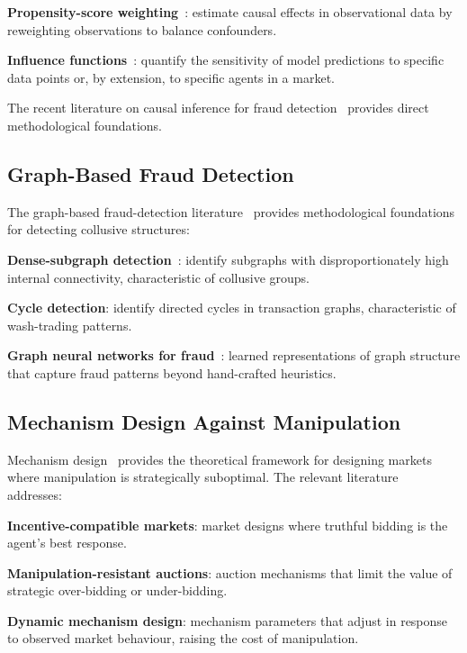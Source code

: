 \documentclass[sigconf,nonacm]{acmart}
\begin{document}
\textbf{Propensity-score weighting}~\cite{rosenbaum1983propensity}:
estimate causal effects in observational data by reweighting
observations to balance confounders.

\textbf{Influence functions}~\cite{koh2017influence}: quantify the
sensitivity of model predictions to specific data points or, by
extension, to specific agents in a market.

The recent literature on causal inference for fraud
detection~\cite{wang2024causalfraud,zhang2024causalmarket} provides
direct methodological foundations.

\subsection{Graph-Based Fraud Detection}

The graph-based fraud-detection literature~\cite{liu2024fraudgnn,
xu2024graphfraudsurv} provides methodological foundations for
detecting collusive structures:

\textbf{Dense-subgraph detection}~\cite{semertzidis2024densesubgraph}:
identify subgraphs with disproportionately high internal connectivity,
characteristic of collusive groups.

\textbf{Cycle detection}: identify directed cycles in transaction
graphs, characteristic of wash-trading patterns.

\textbf{Graph neural networks for fraud}~\cite{liu2024fraudgnn}:
learned representations of graph structure that capture fraud
patterns beyond hand-crafted heuristics.

\subsection{Mechanism Design Against Manipulation}

Mechanism design~\cite{nisan2007algorithmic} provides the
theoretical framework for designing markets where manipulation is
strategically suboptimal. The relevant
literature~\cite{liu2024strategicrank,jain2024mechmarket} addresses:

\textbf{Incentive-compatible markets}: market designs where
truthful bidding is the agent's best response.

\textbf{Manipulation-resistant auctions}: auction mechanisms that
limit the value of strategic over-bidding or under-bidding.

\textbf{Dynamic mechanism design}: mechanism parameters that
adjust in response to observed market behaviour, raising the
cost of manipulation.
\end{document}
